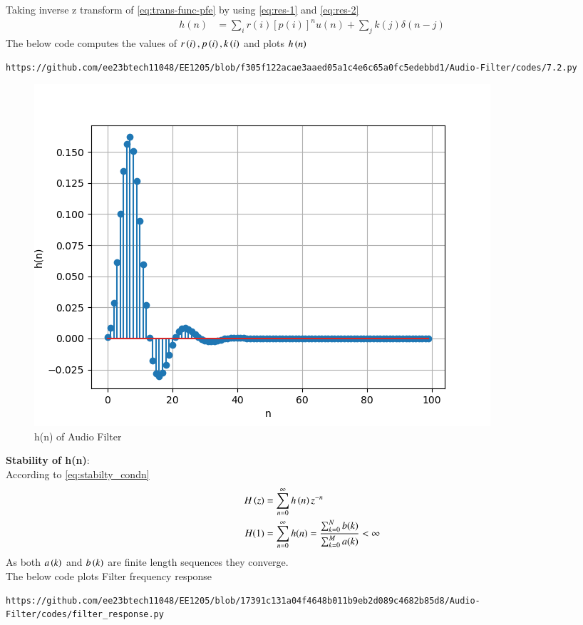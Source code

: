 \documentclass[journal,12pt,twocolumn]{IEEEtran}
\theoremstyle{remark}
\begin{document}
\begin{enumerate}[label=\thesection.\arabic*,ref=\thesection.\theenumi]
Taking inverse z transform of \eqref{eq:trans-func-pfe} by using \eqref{eq:res-1} and \eqref{eq:res-2}
\begin{align}
h(n) &= \sum_{i}r(i)[p(i)]^nu(n) + \sum_{j}k(j)\delta(n - j)
	\label{eq:h-n-expr}
\end{align}
The below code computes the values of $r\left(i\right),p\left(i\right) , k\left(i\right)$ and plots $h\left(n\right)$
\begin{lstlisting}
https://github.com/ee23btech11048/EE1205/blob/f305f122acae3aaed05a1c4e6c65a0fc5edebbd1/Audio-Filter/codes/7.2.py
\end{lstlisting}

\begin{figure}[H]
\centering
\includegraphics[width=\columnwidth]{figs/h(n)_7.2.png}
\caption{h(n) of Audio Filter}
\label{fig:7.2_hn}
\end{figure}
\textbf{Stability of h(n)}:\\
According to \eqref{eq:stabilty_condn}
\begin{align}
H\left(z\right) &= \sum_{n = 0}^{\infty} h\left(n\right)z^{-n}\\
H(1)&= \sum_{n = 0}^{\infty}h(n)  = \frac{\sum_{k = 0}^{N}b(k)}{\sum_{k = 0}^{M}a(k)}< \infty
\end{align}
As both $a\left(k\right)$ and $b\left(k\right)$ are finite length sequences they converge.\\
The below code plots Filter frequency response
\begin{lstlisting}
https://github.com/ee23btech11048/EE1205/blob/17391c131a04f4648b011b9eb2d089c4682b85d8/Audio-Filter/codes/filter_response.py
\end{lstlisting}

\end{enumerate}
\end{document}
